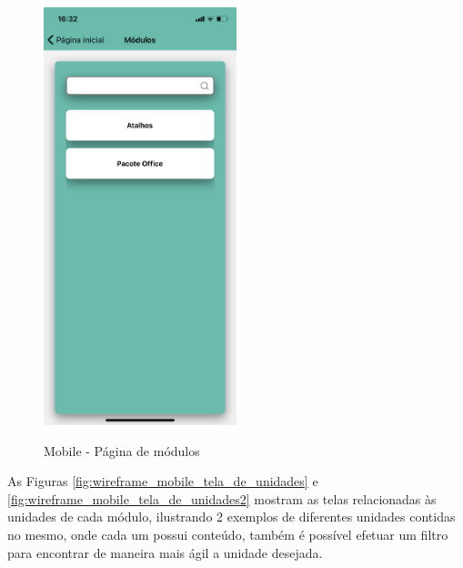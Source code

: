 \begin{figure}[H]
    \centering
    \caption{Mobile - Página de módulos}
    \includegraphics[width=0.5\textwidth]{figuras/Mobile - modulos.png}
    \label{fig:wireframe_mobile_tela_de_modulos}
    {}
\end{figure}

As Figuras \ref{fig:wireframe_mobile_tela_de_unidades} e \ref{fig:wireframe_mobile_tela_de_unidades2} mostram as telas relacionadas às unidades de cada módulo, ilustrando 2 exemplos de diferentes unidades contidas no mesmo, onde cada um possui conteúdo, também é possível efetuar um filtro para encontrar de maneira mais ágil a unidade desejada.

